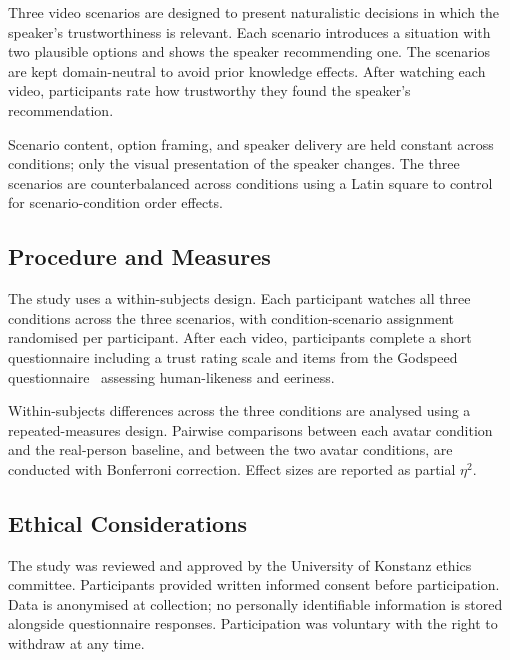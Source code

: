 Three video scenarios are designed to present naturalistic decisions in which the speaker's trustworthiness is relevant. Each scenario introduces a situation with two plausible options and shows the speaker recommending one. The scenarios are kept domain-neutral to avoid prior knowledge effects. After watching each video, participants rate how trustworthy they found the speaker's recommendation.

Scenario content, option framing, and speaker delivery are held constant across conditions; only the visual presentation of the speaker changes. The three scenarios are counterbalanced across conditions using a Latin square to control for scenario-condition order effects.

\subsection{Procedure and Measures}
\label{sec:study_procedure}

The study uses a within-subjects design. Each participant watches all three conditions across the three scenarios, with condition-scenario assignment randomised per participant. After each video, participants complete a short questionnaire including a trust rating scale and items from the Godspeed questionnaire~\cite{macdorman2006} assessing human-likeness and eeriness.

Within-subjects differences across the three conditions are analysed using a repeated-measures design. Pairwise comparisons between each avatar condition and the real-person baseline, and between the two avatar conditions, are conducted with Bonferroni correction. Effect sizes are reported as partial $\eta^2$.

\subsection{Ethical Considerations}
\label{sec:study_ethics}

The study was reviewed and approved by the University of Konstanz ethics committee. Participants provided written informed consent before participation. Data is anonymised at collection; no personally identifiable information is stored alongside questionnaire responses. Participation was voluntary with the right to withdraw at any time.
